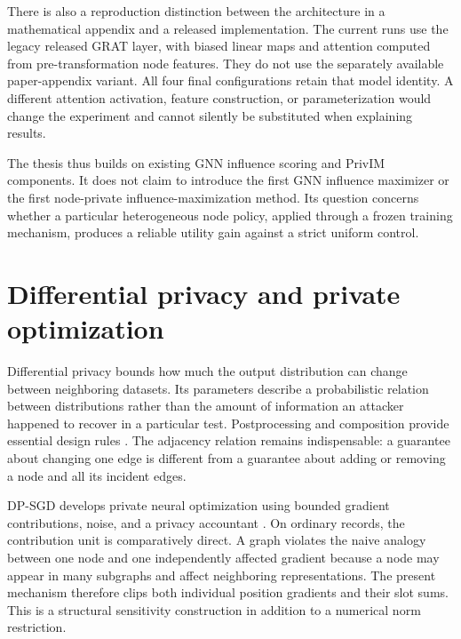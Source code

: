 There is also a reproduction distinction between the architecture in a mathematical appendix and a released implementation. The current runs use the legacy released GRAT layer, with biased linear maps and attention computed from pre-transformation node features. They do not use the separately available paper-appendix variant. All four final configurations retain that model identity. A different attention activation, feature construction, or parameterization would change the experiment and cannot silently be substituted when explaining results.

The thesis thus builds on existing GNN influence scoring and PrivIM components. It does not claim to introduce the first GNN influence maximizer or the first node-private influence-maximization method. Its question concerns whether a particular heterogeneous node policy, applied through a frozen training mechanism, produces a reliable utility gain against a strict uniform control.

\section{Differential privacy and private optimization}
Differential privacy bounds how much the output distribution can change between neighboring datasets. Its parameters describe a probabilistic relation between distributions rather than the amount of information an attacker happened to recover in a particular test. Postprocessing and composition provide essential design rules \cite{dwork2014}. The adjacency relation remains indispensable: a guarantee about changing one edge is different from a guarantee about adding or removing a node and all its incident edges.

DP-SGD develops private neural optimization using bounded gradient contributions, noise, and a privacy accountant \cite{abadi2016}. On ordinary records, the contribution unit is comparatively direct. A graph violates the naive analogy between one node and one independently affected gradient because a node may appear in many subgraphs and affect neighboring representations. The present mechanism therefore clips both individual position gradients and their slot sums. This is a structural sensitivity construction in addition to a numerical norm restriction.

